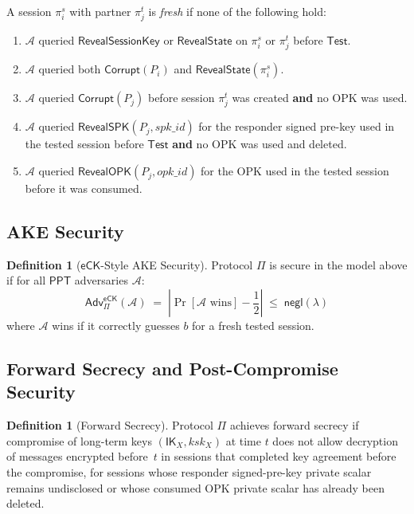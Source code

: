 \documentclass[11pt,a4paper]{article}
\theoremstyle{definition}
\newtheorem{definition}[theorem]{Definition}
\theoremstyle{remark}
\newcommand{\secpar}{\lambda}
\newcommand{\negl}{\mathsf{negl}}
\newcommand{\ppt}{\mathsf{PPT}}
\newcommand{\adv}{\mathsf{Adv}}
\newcommand{\advA}{\mathcal{A}}
\newcommand{\eCK}{\mathsf{eCK}}
\newcommand{\IK}{\mathsf{IK}}
\begin{document}
A session $\pi_i^s$ with partner $\pi_j^t$ is \emph{fresh} if none of the following hold:
\begin{enumerate}[nosep]
  \item $\advA$ queried $\mathsf{RevealSessionKey}$ or
        $\mathsf{RevealState}$ on $\pi_i^s$ or $\pi_j^t$ before
        $\mathsf{Test}$.
  \item $\advA$ queried both $\mathsf{Corrupt}(P_i)$ and
        $\mathsf{RevealState}(\pi_i^s)$.
  \item $\advA$ queried $\mathsf{Corrupt}(P_j)$ before
        session $\pi_j^t$ was created \textbf{and} no OPK was used.
  \item $\advA$ queried $\mathsf{RevealSPK}(P_j,\mathit{spk\_id})$ for the
        responder signed pre-key used in the tested session before
        $\mathsf{Test}$ \textbf{and} no OPK was used and deleted.
  \item $\advA$ queried $\mathsf{RevealOPK}(P_j,\mathit{opk\_id})$ for the
        OPK used in the tested session before it was consumed.
\end{enumerate}

\subsection{AKE Security}

\begin{definition}[$\eCK$-Style AKE Security]
\label{def:ake}
Protocol $\Pi$ is secure in the model above if for all $\ppt$ adversaries $\advA$:
\[
  \adv^{\eCK}_\Pi(\advA) \;=\;
  \left|\Pr[\advA \text{ wins}] - \frac{1}{2}\right|
  \;\leq\; \negl(\secpar)
\]
where $\advA$ wins if it correctly guesses $b$ for a fresh tested session.
\end{definition}

\subsection{Forward Secrecy and Post-Compromise Security}

\begin{definition}[Forward Secrecy]
\label{def:fs}
Protocol $\Pi$ achieves forward secrecy if compromise of long-term keys
$(\IK_X, \mathit{ksk}_X)$ at time $t$ does not allow decryption of messages
encrypted before~$t$ in sessions that completed key agreement before the
compromise, for sessions whose responder signed-pre-key private scalar remains
undisclosed or whose consumed OPK private scalar has already been deleted.
\end{definition}
\end{document}
